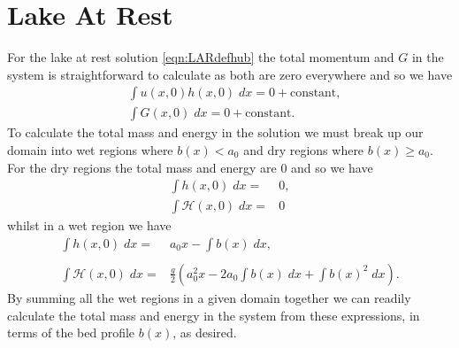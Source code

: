 \section{Lake At Rest}
For the lake at rest solution \eqref{eqn:LARdefhub} the total momentum and $G$ in the system is straightforward to calculate as both are zero everywhere and so we have 
\begin{align}
&\int u(x,0)h(x,0) \;  dx = {} 0 + \text{constant}, \\
&\int G(x,0) \; dx = {} 0 + \text{constant}.
\end{align}
To calculate the total mass and energy in the solution we must break up our domain into wet regions where $b(x) < a_0$ and dry regions where $b(x) \ge a_0$. For the dry regions the total mass and energy are $0$ and so we have 
\begin{subequations}
	\begin{align}
	\int h(x,0) \; dx = {} & 0 , \\
	\int \mathcal{H}(x,0) \; dx = {} & 0
	\end{align}
\end{subequations}
whilst in a wet region we have 
\begin{subequations}
	\begin{align}
	\int h(x,0) \; dx = {} & a_0 x -  \int b(x) \; dx , \\  \nonumber \\
	\int \mathcal{H}(x,0) \; dx = {} & \frac{g}{2} \left(a_0^2x  -  2a_0 \int b(x) \; dx + \int b(x)^2 \; dx \right).
	\end{align}
\end{subequations}
By summing all the wet regions in a given domain together we can readily calculate the total mass and energy in the system from these expressions, in terms of the bed profile $b(x)$, as desired. 
